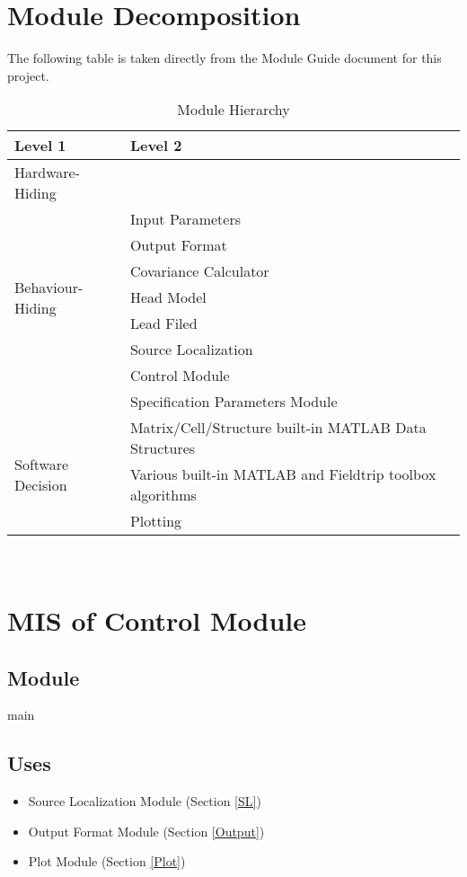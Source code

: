 \documentclass[12pt, titlepage]{article}
\begin{document}
\section{Module Decomposition}

The following table is taken directly from the Module Guide document for this project.

\begin{table}[h!]
\centering
\begin{tabular}{p{} p{}}
\toprule
\textbf{Level 1} & \textbf{Level 2}\\
\midrule

{Hardware-Hiding} & ~ \\
\midrule

\multirow{7}{0.3\textwidth}{Behaviour-Hiding} & Input Parameters\\
& Output Format\\
& Covariance Calculator\\
& Head Model\\
& Lead Filed\\
& Source Localization\\ 
& Control Module\\
& Specification Parameters Module\\
\midrule

\multirow{3}{0.3\textwidth}{Software Decision} & {Matrix/Cell/Structure built-in MATLAB Data Structures}\\
& Various built-in MATLAB and Fieldtrip toolbox algorithms\\
& Plotting\\
\bottomrule

\end{tabular}
\caption{Module Hierarchy}
\label{TblMH}
\end{table}



~\newpage

\section{MIS of Control Module} \label{control} 


\subsection{Module}

main

\subsection{Uses}
\begin{itemize}
\item Source Localization Module (Section \ref{SL})
\item Output Format Module (Section \ref{Output})
\item Plot Module (Section \ref{Plot})
\end{itemize}
\end{document}
